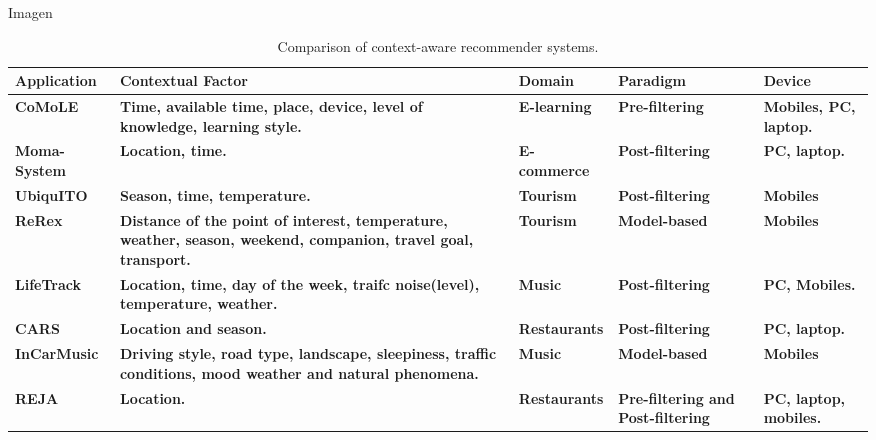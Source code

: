Imagen

\begin{sidewaystable}[]
  \caption{Comparison of context-aware recommender systems.}
    \label{tab:stateoftheart}
  \bigskip
    \centering\small\setlength\tabcolsep{2pt}
        \hspace*{-1cm}\begin{tabular}{p{3.5cm} p{6cm} p{4cm} p{3cm} p{3cm} }%
           \toprule
             \textbf{Application} &\textbf{Contextual Factor} &\textbf{Domain} &\textbf{Paradigm} &\textbf{Device}  \\ \hline

           \midrule
             \textbf{CoMoLE} & \textbf{Time, available time, place, device, level of knowledge, learning style.} & \textbf{E-learning} & \textbf{Pre-filtering} & \textbf{Mobiles, PC, laptop.}   \\ \hline 

             \textbf{Moma-System} & \textbf{Location, time.} & \textbf{E-commerce} & \textbf{Post-filtering} & \textbf{PC, laptop.}  \\ \hline

             \textbf{UbiquITO} & \textbf{Season, time, temperature.} & \textbf{Tourism} & \textbf{Post-filtering} & \textbf{Mobiles} \\ \hline

             \textbf{ReRex} & \textbf{Distance of the point of interest,  temperature, weather, season, weekend, companion, travel goal, transport.} & \textbf{Tourism} & \textbf{Model-based} & \textbf{Mobiles} \\ \hline

             \textbf{LifeTrack} & \textbf{Location, time, day of the week, traifc noise(level), temperature, weather.} & \textbf{Music} & \textbf{ Post-filtering} & \textbf{PC, Mobiles.} \\ \hline

             \textbf{CARS} & \textbf{Location and season.} & \textbf{Restaurants} & \textbf{Post-filtering} & \textbf{PC, laptop.} \\ \hline

             \textbf{InCarMusic} & \textbf{Driving style, road type, landscape, sleepiness, traffic conditions, mood weather and natural phenomena.} & \textbf{Music} & \textbf{Model-based} & \textbf{Mobiles} \\ \hline

            \textbf{REJA} & \textbf{Location.} & \textbf{Restaurants} & \textbf{Pre-filtering and Post-filtering} & \textbf{PC, laptop, mobiles.} \\ \hline


\end{tabular}
\end{sidewaystable}

